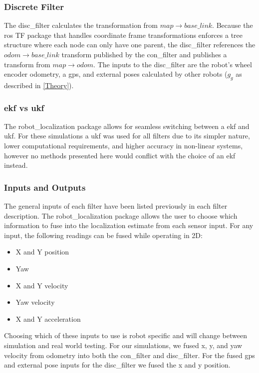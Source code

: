 \documentclass[thesis.tex]{subfile}
\begin{document}
\subsubsection{Discrete Filter} \label{disc_filter_subsubsection}
The \gls{disc_filter} calculates the transformation from $map \rightarrow base\_link$. Because the \gls{ros} TF package that handles coordinate frame transformations enforces a tree structure where each node can only have one parent, the \gls{disc_filter} references the $odom \rightarrow base\_link$ transform published by the \gls{con_filter} and publishes a transform from $map \rightarrow odom$. The inputs to the \gls{disc_filter} are the robot's wheel encoder odometry, %
a \gls{gps}, and external poses calculated by other robots ($g_g$ as described in \cref{Theory}).

\subsubsection{\gls{ekf} vs \gls{ukf}}
The robot\_localization package allows for seamless switching between a \gls{ekf} and \gls{ukf}. For these simulations a \gls{ukf} was used for all filters due to its simpler nature, lower computational requirements, and higher accuracy in non-linear systems, however no methods presented here would conflict with the choice of an \gls{ekf} instead.
 
\subsubsection{Inputs and Outputs}
The general inputs of each filter have been listed previously in each filter description. The robot\_localization package allows the user to choose which information to fuse into the localization estimate from each sensor input. For any input, the following readings can be fused while operating in 2D:
\begin{itemize}
\item X and Y position
\item Yaw
\item X and Y velocity
\item Yaw velocity
\item X and Y acceleration
\end{itemize}
Choosing which of these inputs to use is robot specific and will change between simulation and real world testing. For our simulations, we fused x, y, and yaw velocity from odometry into both the \gls{con_filter} and \gls{disc_filter}. For the fused \gls{gps} and external pose inputs for the \gls{disc_filter} we fused the x and y position.
 
\end{document}
